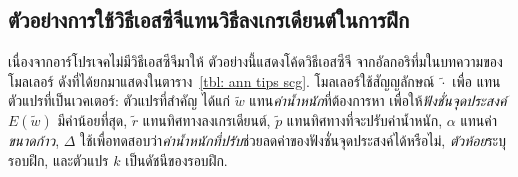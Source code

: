 \subsection{ตัวอย่างการใช้วิธีเอสซีจีแทนวิธีลงเกรเดียนต์ในการฝึก}
\label{sec: scg example}

เนื่องจากอาร์โปรเจคไม่มีวิธีเอสซีจีมาให้ ตัวอย่างนี้แสดงโค้ดวิธีเอสซีจี
จากอัลกอริทึ่มในบทความของโมลเลอร์\cite{Moller1993a} ดังที่ได้ยกมาแสดงในตาราง~\ref{tbl: ann tips scg}.
โมลเลอร์ใช้สัญญลักษณ์ $\tilde{\cdot}$ เพื่อ แทนตัวแปรที่เป็นเวคเตอร์:
ตัวแปรที่สำคัญ ได้แก่
$\tilde{w}$ แทน\textit{ค่าน้ำหนัก}ที่ต้องการหา เพื่อให้\textit{ฟังชั่นจุดประสงค์} $E(\tilde{w})$ มีค่าน้อยที่สุด,
$\tilde{r}$ แทนทิศทางลงเกรเดียนต์,
$\tilde{p}$ แทนทิศทางที่จะปรับค่าน้ำหนัก,
$\alpha$ แทนค่า\textit{ขนาดก้าว},
$\Delta$ ใช้เพื่อทดสอบว่า\textit{ค่าน้ำหนักที่ปรับ}ช่วยลดค่าของฟังชั่นจุดประสงค์ได้หรือไม่,
\textit{ตัวห้อย}ระบุรอบฝึก, 
และตัวแปร $k$ เป็นดัชนีของรอบฝึก.

